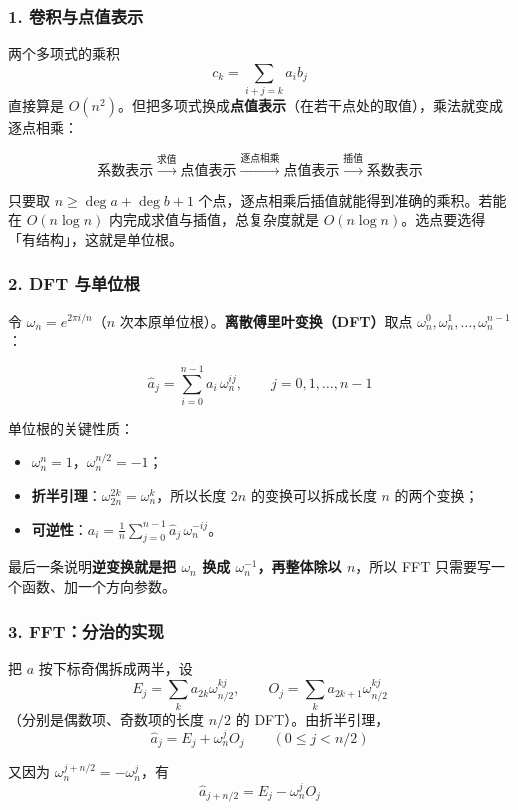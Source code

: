 \subsubsection*{1. 卷积与点值表示}

两个多项式的乘积
$$c_k=\sum_{i+j=k}a_ib_j$$
直接算是 $O(n^2)$。但把多项式换成\textbf{点值表示}（在若干点处的取值），乘法就变成逐点相乘：

$$\text{系数表示} \xrightarrow{\text{求值}} \text{点值表示} \xrightarrow{\text{逐点相乘}} \text{点值表示} \xrightarrow{\text{插值}} \text{系数表示}$$

只要取 $n\ge \deg a+\deg b+1$ 个点，逐点相乘后插值就能得到准确的乘积。若能在 $O(n\log n)$ 内完成求值与插值，总复杂度就是 $O(n\log n)$。选点要选得「有结构」，这就是单位根。

\subsubsection*{2. DFT 与单位根}

令 $\omega_n=e^{2\pi i/n}$（$n$ 次本原单位根）。\textbf{离散傅里叶变换（DFT）}取点 $\omega_n^0,\omega_n^1,\dots,\omega_n^{n-1}$：

$$\hat a_j=\sum_{i=0}^{n-1}a_i\,\omega_n^{ij},\qquad j=0,1,\dots,n-1$$

单位根的关键性质：

\begin{itemize}
    \item $\omega_n^n=1$，$\omega_n^{n/2}=-1$；
    \item \textbf{折半引理}：$\omega_{2n}^{2k}=\omega_n^{k}$，所以长度 $2n$ 的变换可以拆成长度 $n$ 的两个变换；
    \item \textbf{可逆性}：$\displaystyle a_i=\frac1n\sum_{j=0}^{n-1}\hat a_j\,\omega_n^{-ij}$。
\end{itemize}

最后一条说明\textbf{逆变换就是把 $\omega_n$ 换成 $\omega_n^{-1}$，再整体除以 $n$}，所以 FFT 只需要写一个函数、加一个方向参数。

\subsubsection*{3. FFT：分治的实现}

把 $a$ 按下标奇偶拆成两半，设
$$E_j=\sum_{k}a_{2k}\omega_{n/2}^{kj},\qquad O_j=\sum_k a_{2k+1}\omega_{n/2}^{kj}$$
（分别是偶数项、奇数项的长度 $n/2$ 的 DFT）。由折半引理，
$$\hat a_j=E_j+\omega_n^jO_j\qquad (0\le j<n/2)$$

又因为 $\omega_n^{j+n/2}=-\omega_n^{j}$，有
$$\hat a_{j+n/2}=E_j-\omega_n^jO_j$$

